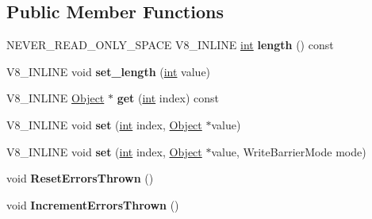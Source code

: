 \subsection*{Public Member Functions}
\begin{DoxyCompactItemize}
\item 
\mbox{\label{classv8_1_1internal_1_1Context_a13341e4d41f9417d3924786fef86390e}} 
N\+E\+V\+E\+R\+\_\+\+R\+E\+A\+D\+\_\+\+O\+N\+L\+Y\+\_\+\+S\+P\+A\+CE V8\+\_\+\+I\+N\+L\+I\+NE \mbox{\hyperlink{classint}{int}} {\bfseries length} () const
\item 
\mbox{\label{classv8_1_1internal_1_1Context_affa065f894de844cc7c4434e2ff694ba}} 
V8\+\_\+\+I\+N\+L\+I\+NE void {\bfseries set\+\_\+length} (\mbox{\hyperlink{classint}{int}} value)
\item 
\mbox{\label{classv8_1_1internal_1_1Context_a9453f24ff6b7930ba2f4f2ed1097d494}} 
V8\+\_\+\+I\+N\+L\+I\+NE \mbox{\hyperlink{classv8_1_1internal_1_1Object}{Object}} $\ast$ {\bfseries get} (\mbox{\hyperlink{classint}{int}} index) const
\item 
\mbox{\label{classv8_1_1internal_1_1Context_ad7158829fdd6fbd912a76803f20da82d}} 
V8\+\_\+\+I\+N\+L\+I\+NE void {\bfseries set} (\mbox{\hyperlink{classint}{int}} index, \mbox{\hyperlink{classv8_1_1internal_1_1Object}{Object}} $\ast$value)
\item 
\mbox{\label{classv8_1_1internal_1_1Context_af2d0487e7d4cd133e5706bfb13e5b516}} 
V8\+\_\+\+I\+N\+L\+I\+NE void {\bfseries set} (\mbox{\hyperlink{classint}{int}} index, \mbox{\hyperlink{classv8_1_1internal_1_1Object}{Object}} $\ast$value, Write\+Barrier\+Mode mode)
\item 
\mbox{\label{classv8_1_1internal_1_1Context_a77a84fa62d4ac888d2e3d8145d5a5b41}} 
void {\bfseries Reset\+Errors\+Thrown} ()
\item 
\mbox{\label{classv8_1_1internal_1_1Context_a45c7578e35899abb488b4df8a4a653ea}} 
void {\bfseries Increment\+Errors\+Thrown} ()
\item 
\mbox{\label{classv8_1_1internal_1_1Context_a0c2b56c13994194ebcc9cfe87d331937}} 

\end{DoxyCompactItemize}
